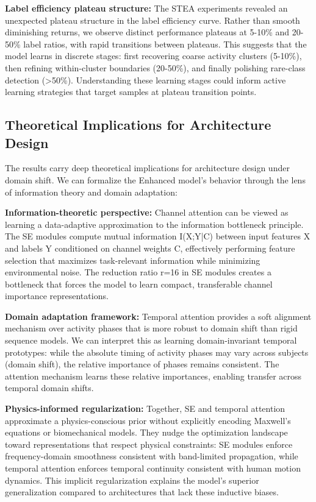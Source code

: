 \documentclass[journal]{IEEEtran}
\begin{document}
\textbf{Label efficiency plateau structure:} The STEA experiments revealed an unexpected plateau structure in the label efficiency curve. Rather than smooth diminishing returns, we observe distinct performance plateaus at 5-10\% and 20-50\% label ratios, with rapid transitions between plateaus. This suggests that the model learns in discrete stages: first recovering coarse activity clusters (5-10\%), then refining within-cluster boundaries (20-50\%), and finally polishing rare-class detection (>50\%). Understanding these learning stages could inform active learning strategies that target samples at plateau transition points.

\subsection{Theoretical Implications for Architecture Design}
The results carry deep theoretical implications for architecture design under domain shift. We can formalize the Enhanced model's behavior through the lens of information theory and domain adaptation:

\textbf{Information-theoretic perspective:} Channel attention can be viewed as learning a data-adaptive approximation to the information bottleneck principle. The SE modules compute mutual information I(X;Y|C) between input features X and labels Y conditioned on channel weights C, effectively performing feature selection that maximizes task-relevant information while minimizing environmental noise. The reduction ratio r=16 in SE modules creates a bottleneck that forces the model to learn compact, transferable channel importance representations.

\textbf{Domain adaptation framework:} Temporal attention provides a soft alignment mechanism over activity phases that is more robust to domain shift than rigid sequence models. We can interpret this as learning domain-invariant temporal prototypes: while the absolute timing of activity phases may vary across subjects (domain shift), the relative importance of phases remains consistent. The attention mechanism learns these relative importances, enabling transfer across temporal domain shifts.

\textbf{Physics-informed regularization:} Together, SE and temporal attention approximate a physics-conscious prior without explicitly encoding Maxwell's equations or biomechanical models. They nudge the optimization landscape toward representations that respect physical constraints: SE modules enforce frequency-domain smoothness consistent with band-limited propagation, while temporal attention enforces temporal continuity consistent with human motion dynamics. This implicit regularization explains the model's superior generalization compared to architectures that lack these inductive biases.
\end{document}

